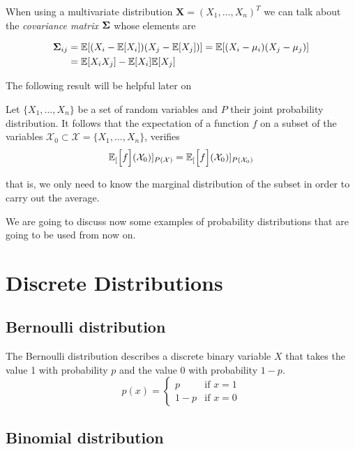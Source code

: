 When using a multivariate distribution \(\bm{X} = (X_1,\dots,X_n)^T\) we can talk about the \emph{covariance
  matrix} \(\bm{\Sigma} \) whose elements are

\[
\begin{aligned}
\bm{\Sigma}_{ij} &= \mathbb{E}[ (X_i - \mathbb{E}[X_i])
(X_j - \mathbb{E}[X_j]) ] = \mathbb{E}[(X_i - \mu_i)(X_j - \mu_j)]\\
&=\mathbb{E}[X_iX_j]-\mathbb{E}[X_i]\mathbb{E}[X_j]
\end{aligned}
\]

The following result will be helpful later on

\begin{proposition}
  Let \(\{X_1,\dots,X_n\}\) be a set of random variables and \(P\) their joint
  probability distribution.
  It follows that the expectation of a function \(f\) on a subset of the
  variables \(\mathcal{X}_0 \subset \mathcal{X} = \{X_1,\dots,X_n\}\), verifies
    \[
      \mathbb{E}_{[}\Big[f\Big](\mathcal{X}_0)]_{P(\mathcal{X})} = \mathbb{E}_{[}\Big[f\Big](\mathcal{X}_0)]_{P(\mathcal{X}_0)}
    \]

    that is, we only need to know the marginal distribution of the subset in
    order to carry out the average.
\end{proposition}


We are going to discuss now some examples of probability distributions that are
going to be used from now on.

\section{Discrete Distributions}

\subsection{Bernoulli distribution}

The Bernoulli distribution describes a discrete binary variable \(X\) that takes
the value 1 with probability \(p\) and the value 0 with probability \(1-p\).
\[
  p(x) =
\left\{
  \begin{array}{ll}
    p  & \mbox{if } x = 1 \\
    1-p & \mbox{if } x = 0
  \end{array}
\right.
\]


\subsection{Binomial distribution}

